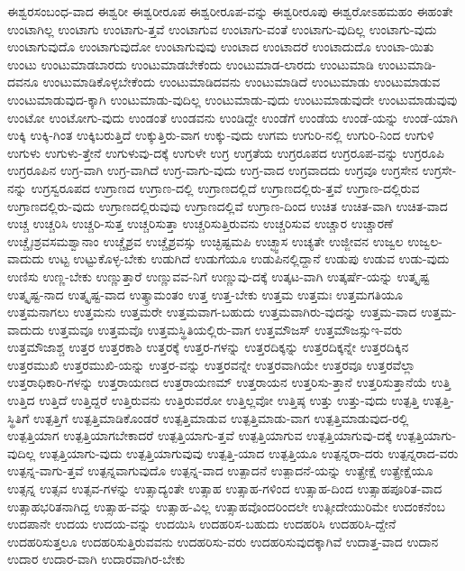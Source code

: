 {ಈಶ್ವರಸಂಬಂಧ-ವಾದ
ಈಶ್ವರೀ
ಈಶ್ವರೀರೂಪ
ಈಶ್ವರೀರೂಪ-ವನ್ನು
ಈಶ್ವರೀರೂಪು
ಈಶ್ವರೋಽಹಮಹಂ
ಈಹಂತೇ
ಉಂಟಾಗಿಲ್ಲ
ಉಂಟಾಗು
ಉಂಟಾಗು-ತ್ತವೆ
ಉಂಟಾಗುವ
ಉಂಟಾಗು-ವಂತೆ
ಉಂಟಾಗು-ವುದಿಲ್ಲ
ಉಂಟಾಗು-ವುದು
ಉಂಟಾಗುವುದೊ
ಉಂಟಾಗುವುದೋ
ಉಂಟಾಗುವುವು
ಉಂಟಾದ
ಉಂಟಾದರೆ
ಉಂಟಾದುದೊ
ಉಂಟಾ-ಯಿತು
ಉಂಟು
ಉಂಟುಮಾಡಬಾರದು
ಉಂಟುಮಾಡಬೇಕೆಂದು
ಉಂಟುಮಾಡ-ಲಾರದು
ಉಂಟುಮಾಡಿ
ಉಂಟುಮಾಡಿ-ದವನೂ
ಉಂಟುಮಾಡಿಕೊಳ್ಳಬೇಕೆಂದು
ಉಂಟುಮಾಡಿದವನು
ಉಂಟುಮಾಡಿದೆ
ಉಂಟುಮಾಡು
ಉಂಟುಮಾಡುವ
ಉಂಟುಮಾಡುವುದ-ಕ್ಕಾಗಿ
ಉಂಟುಮಾಡು-ವುದಿಲ್ಲ
ಉಂಟುಮಾಡು-ವುದು
ಉಂಟುಮಾಡುವುದೇ
ಉಂಟುಮಾಡುವುವು
ಉಂಟೋ
ಉಂಟೋಗು-ವುದು
ಉಂಡಂತೆ
ಉಂಡವನು
ಉಂಡಿದ್ದೇ
ಉಂಡೆಗೆ
ಉಂಡೆಯ
ಉಂಡೆ-ಯನ್ನು
ಉಂಡೆ-ಯಾಗಿ
ಉಕ್ಕಿ
ಉಕ್ಕಿ-ಗಿಂತ
ಉಕ್ಕಿಬರುತ್ತಿದೆ
ಉಕ್ಕುತ್ತಿರು-ವಾಗ
ಉಕ್ಕು-ವುದು
ಉಗಮ
ಉಗುರಿ-ನಲ್ಲಿ
ಉಗುರಿ-ನಿಂದ
ಉಗುಳಿ
ಉಗುಳು
ಉಗುಳು-ತ್ತೇನೆ
ಉಗುಳುವು-ದಕ್ಕೆ
ಉಗುಳೇ
ಉಗ್ರ
ಉಗ್ರತೆಯ
ಉಗ್ರರೂಪದ
ಉಗ್ರರೂಪ-ವನ್ನು
ಉಗ್ರರೂಪಿ
ಉಗ್ರರೂಪಿನ
ಉಗ್ರ-ವಾಗಿ
ಉಗ್ರ-ವಾಗಿದೆ
ಉಗ್ರ-ವಾಗು-ವುದು
ಉಗ್ರ-ವಾದ
ಉಗ್ರವಾದದು
ಉಗ್ರವೂ
ಉಗ್ರಸೇನ
ಉಗ್ರಸೇ-ನನ್ನು
ಉಗ್ರಸ್ವರೂಪದ
ಉಗ್ರಾಣದ
ಉಗ್ರಾಣ-ದಲ್ಲಿ
ಉಗ್ರಾಣದಲ್ಲಿದೆ
ಉಗ್ರಾಣದಲ್ಲಿರು-ತ್ತವೆ
ಉಗ್ರಾಣ-ದಲ್ಲಿರುವ
ಉಗ್ರಾಣದಲ್ಲಿರು-ವುದು
ಉಗ್ರಾಣದಲ್ಲಿರುವುವು
ಉಗ್ರಾಣದಲ್ಲಿವೆ
ಉಗ್ರಾಣ-ದಿಂದ
ಉಚಿತ
ಉಚಿತ-ವಾಗಿ
ಉಚಿತ-ವಾದ
ಉಚ್ಚ
ಉಚ್ಚರಿಸಿ
ಉಚ್ಚರಿ-ಸುತ್ತ
ಉಚ್ಚರಿಸುತ್ತಾ
ಉಚ್ಚರಿಸುತ್ತಿರುವನು
ಉಚ್ಚರಿಸುವ
ಉಚ್ಚಾರ
ಉಚ್ಚಾರಣೆ
ಉಚ್ಚೈಃಶ್ರವಸಮಶ್ವಾನಾಂ
ಉಚ್ಚೈಶ್ರವ
ಉಚ್ಚೈಶ್ರವಸ್ಸು
ಉಚ್ಛಿಷ್ಟಮಪಿ
ಉಚ್ಛ್ವಾಸ
ಉಚ್ಯತೇ
ಉಜ್ಜೀವನ
ಉಜ್ವಲ
ಉಜ್ವಲ-ವಾದುದು
ಉಟ್ಟ
ಉಟ್ಟುಕೊಳ್ಳ-ಬೇಕು
ಉಡುಗಿದೆ
ಉಡುಗೆಯೂ
ಉಡುಪಿನಲ್ಲಿದ್ದಾನೆ
ಉಡುಪು
ಉಡುವ
ಉಡು-ವುದು
ಉಣಿಸು
ಉಣ್ಣ-ಬೇಕು
ಉಣ್ಣುತ್ತಾರೆ
ಉಣ್ಣುವವ-ನಿಗೆ
ಉಣ್ಣುವು-ದಕ್ಕೆ
ಉತ್ಕಟ-ವಾಗಿ
ಉತ್ಕರ್ಷೆ-ಯನ್ನು
ಉತ್ಕೃಷ್ಟ
ಉತ್ಕೃಷ್ಟ-ನಾದ
ಉತ್ಕೃಷ್ಟ-ವಾದ
ಉತ್ಕ್ರಾಮಂತಂ
ಉತ್ತ
ಉತ್ತ-ಬೇಕು
ಉತ್ತಮ
ಉತ್ತಮಃ
ಉತ್ತಮಗತಿಯೂ
ಉತ್ತಮನಾಗಲು
ಉತ್ತಮನು
ಉತ್ತಮರೇ
ಉತ್ತಮವಾಗ-ಬಹುದು
ಉತ್ತಮವಾಗಿರು-ವುದನ್ನು
ಉತ್ತಮ-ವಾದ
ಉತ್ತಮ-ವಾದುದು
ಉತ್ತಮವೂ
ಉತ್ತಮವೊ
ಉತ್ತಮಸ್ಥಿತಿಯಲ್ಲಿರು-ವಾಗ
ಉತ್ತಮೌಜಸ್
ಉತ್ತಮೌಜಸ್ಸುಇ-ವರು
ಉತ್ತಮೌಜಾಶ್ಚ
ಉತ್ತರ
ಉತ್ತರಕಾಶಿ
ಉತ್ತರಕ್ಕೆ
ಉತ್ತರ-ಗಳನ್ನು
ಉತ್ತರದಿಕ್ಕನ್ನು
ಉತ್ತರದಿಕ್ಕನ್ನೇ
ಉತ್ತರದಿಕ್ಕಿನ
ಉತ್ತರಮುಖಿ
ಉತ್ತರಮುಖಿ-ಯನ್ನು
ಉತ್ತರ-ವನ್ನು
ಉತ್ತರವನ್ನೇ
ಉತ್ತರವಾಗಿಯೇ
ಉತ್ತರವೂ
ಉತ್ತರವೆಲ್ಲಾ
ಉತ್ತರಾಧಿಕಾರಿ-ಗಳನ್ನು
ಉತ್ತರಾಯಣದ
ಉತ್ತರಾಯಣಮ್
ಉತ್ತರಾಯನ
ಉತ್ತರಿಸು-ತ್ತಾನೆ
ಉತ್ತರಿಸುತ್ತಾನೆಯೆ
ಉತ್ತಿ
ಉತ್ತಿದ
ಉತ್ತಿದೆ
ಉತ್ತಿದ್ದರೆ
ಉತ್ತಿರುವನು
ಉತ್ತಿರುವರೋ
ಉತ್ತಿಲ್ಲವೋ
ಉತ್ತಿಷ್ಠ
ಉತ್ತು
ಉತ್ತು-ವುದು
ಉತ್ಪತ್ತಿ
ಉತ್ಪತ್ತಿ-ಸ್ಥಿತಿಗೆ
ಉತ್ಪತ್ತಿಗೆ
ಉತ್ಪತ್ತಿಮಾಡಿಕೊಂಡರೆ
ಉತ್ಪತ್ತಿಮಾಡುವ
ಉತ್ಪತ್ತಿಮಾಡು-ವಾಗ
ಉತ್ಪತ್ತಿಮಾಡುವುದ-ರಲ್ಲಿ
ಉತ್ಪತ್ತಿಯಾಗ
ಉತ್ಪತ್ತಿಯಾಗಬೇಕಾದರೆ
ಉತ್ಪತ್ತಿಯಾಗು-ತ್ತವೆ
ಉತ್ಪತ್ತಿಯಾಗುವ
ಉತ್ಪತ್ತಿಯಾಗುವು-ದಕ್ಕೆ
ಉತ್ಪತ್ತಿಯಾಗು-ವುದಿಲ್ಲ
ಉತ್ಪತ್ತಿಯಾಗು-ವುದು
ಉತ್ಪತ್ತಿಯಾಗುವುವು
ಉತ್ಪತ್ತಿ-ಯಾದ
ಉತ್ಪತ್ತಿಯೂ
ಉತ್ಪನ್ನರಾ-ದರು
ಉತ್ಪನ್ನರಾದ-ವರು
ಉತ್ಪನ್ನ-ವಾಗು-ತ್ತವೆ
ಉತ್ಪನ್ನವಾಗುವುದೊ
ಉತ್ಪನ್ನ-ವಾದ
ಉತ್ಪಾದನೆ
ಉತ್ಪಾದನೆ-ಯನ್ನು
ಉತ್ಪ್ರೇಕ್ಷೆ
ಉತ್ಪ್ರೇಕ್ಷೆಯೂ
ಉತ್ಸನ್ನ
ಉತ್ಸವ
ಉತ್ಸವ-ಗಳನ್ನು
ಉತ್ಸಾದ್ಯಂತೇ
ಉತ್ಸಾಹ
ಉತ್ಸಾಹ-ಗಳಿಂದ
ಉತ್ಸಾಹ-ದಿಂದ
ಉತ್ಸಾಹಪೂರಿತ-ವಾದ
ಉತ್ಸಾಹಭರಿತನಾಗಿದ್ದ
ಉತ್ಸಾಹ-ವನ್ನು
ಉತ್ಸಾಹ-ವಿಲ್ಲ
ಉತ್ಸಾಹವೊಂದರಿಂದಲೇ
ಉತ್ಸೀದೇಯುರಿಮೇ
ಉದಂಕನೆಂಬ
ಉದಪಾನೇ
ಉದಯ
ಉದಯ-ವನ್ನು
ಉದಯಿಸಿ
ಉದಹರಿಸ-ಬಹುದು
ಉದಹರಿಸಿ
ಉದಹರಿಸಿ-ದ್ದೇನೆ
ಉದಹರಿಸುತ್ತಲೂ
ಉದಹರಿಸುತ್ತಿರುವವನು
ಉದಹರಿಸು-ವರು
ಉದಹರಿಸುವುದಕ್ಕಾಗಿವೆ
ಉದಾತ್ತ-ವಾದ
ಉದಾನ
ಉದಾರ
ಉದಾರ-ವಾಗಿ
ಉದಾರವಾಗಿರ-ಬೇಕು
}

